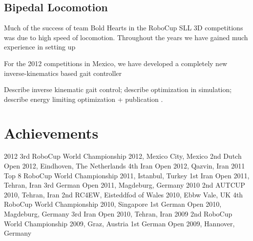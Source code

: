 \documentclass{llncs}
\begin{document}
\subsection{Bipedal Locomotion}
\label{sec:bipedal-locomotion}

Much of the success of team Bold Hearts in the RoboCup SLL 3D
competitions was due to high speed of locomotion. Throughout the years we have gained much experience in setting up 


For the 2012 competitions in Mexico, we have developed a completely new inverse-kinematics based gait controller


 Describe inverse
kinematic gait control; describe optimization in simulation; describe
energy limiting optimization + publication
\cite{lattarulo_application_2011}.

\section{Achievements}
\label{sec:achievements}

2012
3rd RoboCup World Championship 2012, Mexico City, Mexico
2nd Dutch Open 2012, Eindhoven, The Netherlands
4th Iran Open 2012, Qazvin, Iran
2011
Top 8 RoboCup World Championship 2011, Istanbul, Turkey
1st Iran Open 2011, Tehran, Iran
3rd German Open 2011, Magdeburg, Germany
2010
2nd AUTCUP 2010, Tehran, Iran
2nd RC4EW, Eisteddfod of Wales 2010, Ebbw Vale, UK
4th RoboCup World Championship 2010, Singapore
1st German Open 2010, Magdeburg, Germany
3rd Iran Open 2010, Tehran, Iran
2009
2nd RoboCup World Championship 2009, Graz, Austria
1st German Open 2009, Hannover, Germany



\end{document}
